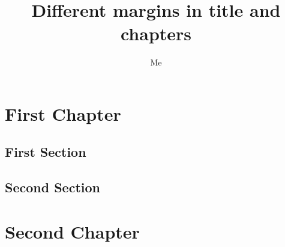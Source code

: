 \documentclass{scrreprt}
\title{Different margins in title and chapters}
\author{Me}
\begin{document}
\maketitle

\chapter{First Chapter}

\section{First Section}

\lipsum[1-20]

\section{Second Section}

\lipsum[1-20]

\chapter{Second Chapter}

\lipsum[1-20]
\end{document}
